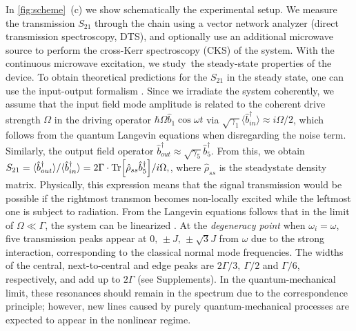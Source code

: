 \documentclass[%
 aps, pra,
 amsmath,amssymb,
 reprint,%
superscriptaddress
]{revtex4-2}
\begin{document}
In \autoref{fig:scheme}~(c) we show schematically the experimental setup. We measure the transmission $S_{21}$ through the chain using a vector network analyzer (direct transmission spectroscopy, DTS), and optionally use an additional microwave source to perform the cross-Kerr spectroscopy (CKS) of the system. With the continuous microwave excitation, we study the steady-state properties of the device. To obtain theoretical predictions for the $S_{21}$ in the steady state, one can use the input-output formalism \cite{yurke1984quantum,gardiner1985input}. Since we irradiate the system coherently, we assume that the input field mode amplitude is related to the coherent drive strength $\Omega$ in the driving operator $\hbar \Omega \hat b_1 \cos \omega t$ via $\sqrt{\gamma_1} \langle  \hat b_{in}^\dag \rangle \approx i \Omega/2$, which follows from the quantum Langevin equations when disregarding the noise term. Similarly, the output field operator $\hat b_{out}^\dag \approx \sqrt{\gamma_5} \hat b_5^\dag$. From this, we obtain $
	S_{21} = \langle \hat b_{out}^\dag\rangle / \langle \hat b_{in}^\dag \rangle = 2\Gamma\cdot \Tr[\hat \rho_{ss} \hat b_5^\dag]/{i\Omega} ,
$,
where $\hat \rho_{ss}$ is the steadystate density matrix. Physically, this expression means that the signal transmission would be possible if the rightmost transmon becomes non-locally excited while the leftmost one is subject to radiation. From the Langevin equations follows that in the limit of $\Omega \ll \Gamma$, the system can be linearized \cite{astafiev2010resonance}. At the \textit{degeneracy point} when $\omega_i = \omega$, five transmission peaks appear at $0,\, \pm J,\, \pm \sqrt{3} J$ from $\omega$ due to the strong interaction, corresponding to the classical normal mode frequencies. The widths of the central, next-to-central and edge peaks are $2\Gamma/3,\ \Gamma/2$ and $\Gamma/6$, respectively, and add up to $2\Gamma$ (see Supplements).  In the quantum-mechanical limit, these resonances should remain in the spectrum due to the correspondence principle; however, new lines caused by purely quantum-mechanical processes are expected to appear in the nonlinear regime.
\end{document}

